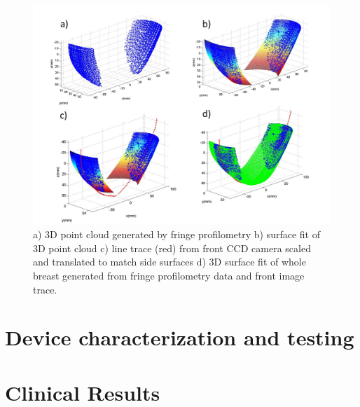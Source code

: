 \begin{figure}[ht]
\begin{center}
\includegraphics[width=14.5cm]{./figures/4_Gen3/proffit.png}
\caption{ a) 3D point cloud generated by fringe profilometry b)  surface fit of 3D point cloud c) line trace (red) from front CCD camera scaled and translated to match side surfaces d) 3D surface fit of whole breast generated from fringe profilometry data and front image trace.}
\label{fig:proffit}
\end{center}
\end{figure}

\section{Device characterization and testing}

\section{Clinical Results}
